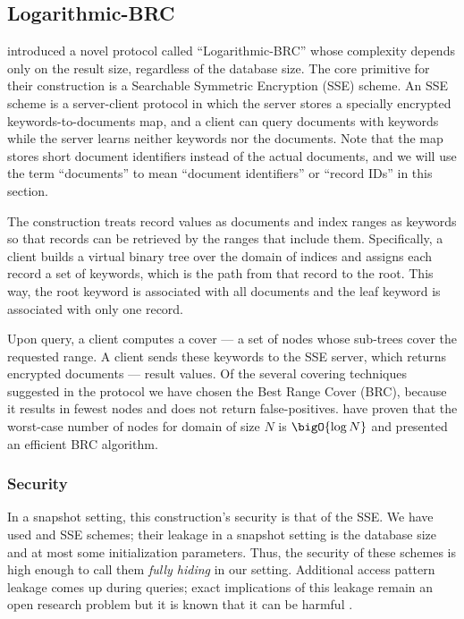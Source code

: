 \subsection{Logarithmic-BRC}

	\textcite{practical-range-search} introduced a novel protocol called ``Logarithmic\hyp{}BRC'' whose {\IO} complexity depends only on the result size, regardless of the database size.
	The core primitive for their construction is a Searchable Symmetric Encryption (SSE) scheme.
	An SSE scheme is a server-client protocol in which the server stores a specially encrypted keywords-to-documents map, and a client can query documents with keywords while the server
	learns neither keywords nor the documents.
	Note that the map stores short document identifiers instead of the actual documents, and we will use the term ``documents'' to mean ``document identifiers'' or ``record IDs'' in this section.

	The construction treats record values as documents and index ranges as keywords so that records can be retrieved by the ranges that include them.
	Specifically, a client builds a virtual binary tree over the domain of indices and assigns each record a set of keywords, which is the path from that record to the root.
	This way, the root keyword is associated with all documents and the leaf keyword is associated with only one record.

	Upon query, a client computes a cover --- a set of nodes whose sub-trees cover the requested range.
	A client sends these keywords to the SSE server, which returns encrypted documents --- result values.
	Of the several covering techniques suggested in the protocol \cite{practical-range-search} we have chosen the Best Range Cover (BRC), because it results in fewest nodes and does not return false-positives.
	\textcite{brc} have proven that the worst-case number of nodes for domain of size $N$ is $\bigO{\log N}$ and presented an efficient BRC algorithm.

	\subsubsection{Security}
		In a snapshot setting, this construction's security is that of the SSE\@.
		We have used \cite{cjjkrs-13} and \cite{cjjjkrs-14} SSE schemes; their leakage in a snapshot setting is the database size and at most some initialization parameters.
		Thus, the security of these schemes is high enough to call them \emph{fully hiding} in our setting.
		Additional access pattern leakage comes up during queries; exact implications of this leakage remain an open research problem but it is known that it can be harmful \cite{generic-attacks-kellaris}.

